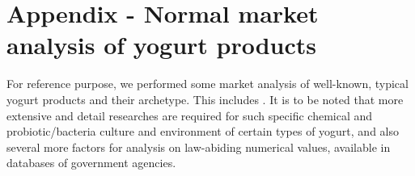 \documentclass{iopjournal}
\begin{document}
\section{Appendix - Normal market analysis of yogurt products}

For reference purpose, we performed some market analysis of well-known, typical yogurt products and their archetype. This includes \cite{Nutifood_NutimilkEatable2022,Nutifood_NuviLivingFerment2022,Nutifood_NuviDrinkable2022,Vinamilk_LowSugarYogurt_OpenFoodFacts,Vinamilk_YogurtPlainMyNetDiary,Vinamilk_YogurtDrinkMixedFruits}. It is to be noted that more extensive and detail researches are required for such specific chemical and probiotic/bacteria culture and environment of certain types of yogurt, and also several more factors for analysis on law-abiding numerical values, available in databases of government agencies. 
\end{document}
